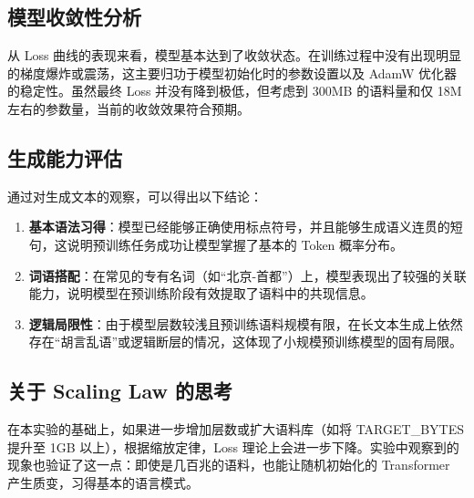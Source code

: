 \documentclass[a4paper,12pt]{ctexart} %
\begin{document}
\subsection{模型收敛性分析}
从 Loss 曲线的表现来看，模型基本达到了收敛状态。在训练过程中没有出现明显的梯度爆炸或震荡，这主要归功于模型初始化时的参数设置以及 AdamW 优化器的稳定性。虽然最终 Loss 并没有降到极低，但考虑到 300MB 的语料量和仅 18M 左右的参数量，当前的收敛效果符合预期。

\subsection{生成能力评估}
通过对生成文本的观察，可以得出以下结论：
\begin{enumerate}
    \item \textbf{基本语法习得}：模型已经能够正确使用标点符号，并且能够生成语义连贯的短句，这说明预训练任务成功让模型掌握了基本的 Token 概率分布。
    \item \textbf{词语搭配}：在常见的专有名词（如“北京-首都”）上，模型表现出了较强的关联能力，说明模型在预训练阶段有效提取了语料中的共现信息。
    \item \textbf{逻辑局限性}：由于模型层数较浅且预训练语料规模有限，在长文本生成上依然存在“胡言乱语”或逻辑断层的情况，这体现了小规模预训练模型的固有局限。
\end{enumerate}

\subsection{关于 Scaling Law 的思考}
在本实验的基础上，如果进一步增加层数或扩大语料库（如将 TARGET\_BYTES 提升至 1GB 以上），根据缩放定律，Loss 理论上会进一步下降。实验中观察到的现象也验证了这一点：即使是几百兆的语料，也能让随机初始化的 Transformer 产生质变，习得基本的语言模式。
\end{document}
